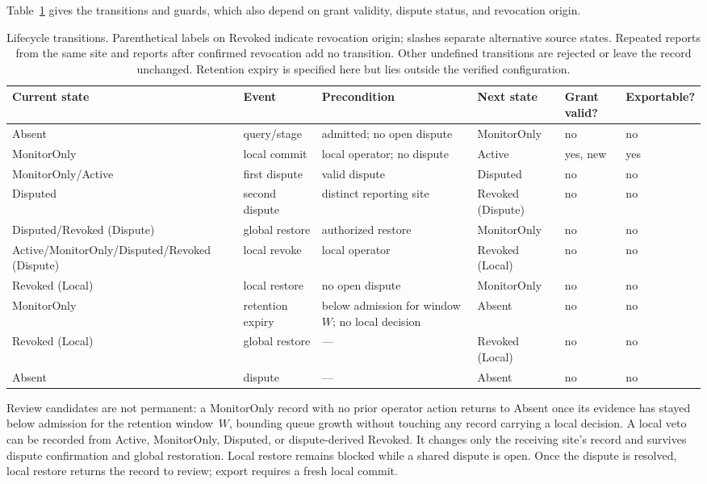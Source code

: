 \documentclass[journal]{IEEEtran}
\theoremstyle{definition}
\begin{document}
Table~\ref{tab:transitions} gives the transitions and guards, which also depend on grant validity, dispute status, and revocation origin.
\begin{table}[t]
\centering
\caption{Lifecycle transitions. Parenthetical labels on Revoked indicate revocation origin; slashes separate alternative source states. Repeated reports from the same site and reports after confirmed revocation add no transition. Other undefined transitions are rejected or leave the record unchanged. Retention expiry is specified here but lies outside the verified configuration.}
\label{tab:transitions}
\scriptsize
\begin{tabular}{@{}llllll@{}}
\toprule
Current state & Event & Precondition & Next state & Grant valid? & Exportable? \\
\midrule
Absent & query/stage & admitted; no open dispute & MonitorOnly & no & no \\
MonitorOnly & local commit & local operator; no dispute & Active & yes, new & yes \\
MonitorOnly/Active & first dispute & valid dispute & Disputed & no & no \\
Disputed & second dispute & distinct reporting site & Revoked (Dispute) & no & no \\
Disputed/Revoked (Dispute) & global restore & authorized restore & MonitorOnly & no & no \\
Active/MonitorOnly/Disputed/Revoked (Dispute) & local revoke & local operator & Revoked (Local) & no & no \\
Revoked (Local) & local restore & no open dispute & MonitorOnly & no & no \\
MonitorOnly & retention expiry & below admission for window $W$; no local decision & Absent & no & no \\
Revoked (Local) & global restore & --- & Revoked (Local) & no & no \\
Absent & dispute & --- & Absent & no & no \\
\bottomrule
\end{tabular}
\end{table}

Review candidates are not permanent: a MonitorOnly record with no prior operator action returns to Absent once its evidence has stayed below admission for the retention window~$W$, bounding queue growth without touching any record carrying a local decision. A local veto can be recorded from Active, MonitorOnly, Disputed, or dispute-derived Revoked. It changes only the receiving site's record and survives dispute confirmation and global restoration. Local restore remains blocked while a shared dispute is open. Once the dispute is resolved, local restore returns the record to review; export requires a fresh local commit.
\end{document}
